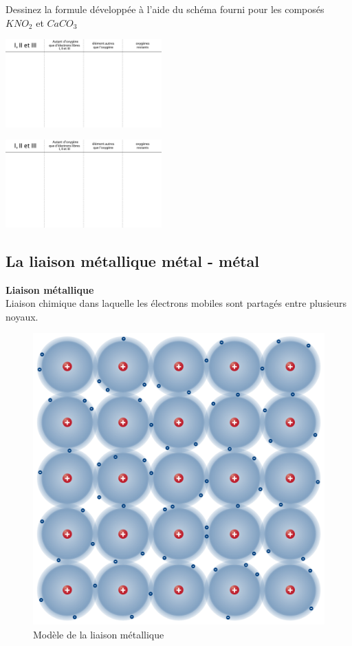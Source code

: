 \documentclass[
  11pt,
  a4paper,
  openany]{book}
\begin{document}
\begin{Exercise}

Dessinez la formule développée à l'aide du schéma fourni pour les composés \(KNO_2\) et \(CaCO_3\)

\begin{multicols}{2}
\includegraphics[width=0.45\textwidth,height=\textheight]{exe/formule-developpee.png}

\includegraphics[width=0.45\textwidth,height=\textheight]{exe/formule-developpee.png}

\end{multicols}

\end{Exercise}

\newpage

\hypertarget{la-liaison-muxe9tallique-muxe9tal---muxe9tal}{%
\subsection{La liaison métallique \textbar{} métal - métal}\label{la-liaison-muxe9tallique-muxe9tal---muxe9tal}}

\begin{tcolorbox}
\textbf{Liaison métallique}\\
Liaison chimique dans laquelle les électrons mobiles sont partagés entre plusieurs noyaux.

\end{tcolorbox}

\begin{figure}

{\centering \includegraphics[width=0.4\linewidth]{images/metallic-bonding} 

}

\caption{Modèle de la liaison métallique}\label{fig:metallic-bonding}
\end{figure}
\end{document}
